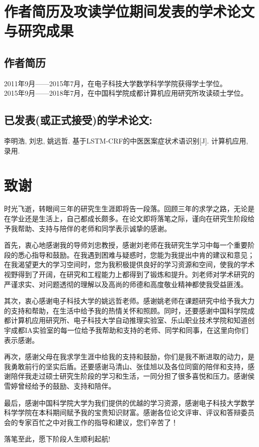 \chapter{作者简历及攻读学位期间发表的学术论文与研究成果}
\section*{作者简历}
\noindent2011年9月——2015年7月，在电子科技大学数学科学学院获得学士学位。\\
\noindent2015年9月——2018年7月，在中国科学院成都计算机应用研究所攻读硕士学位。

\section*{已发表(或正式接受)的学术论文:}
\noindent[1] 李明浩, 刘忠, 姚远哲. 基于LSTM-CRF的中医医案症状术语识别[J]. 计算机应用, 录用.

\chapter{致\quad 谢}
时光飞逝，转眼间三年的研究生生涯即将告一段落。回顾三年的求学之路，无论是在学业还是生活上，自己都成长颇多。在论文即将落笔之际，谨向在研究生阶段给予我帮助、支持与陪伴的老师和同学表示诚挚的感谢。

首先，衷心地感谢我的导师刘忠教授，感谢刘老师在我研究生学习中每一个重要阶段的悉心指导和鼓励。在我遇到困难与疑惑时，您能为我提出中肯的建议和意见；在我渴望更大的学习空间时，您为我积极提供良好的学习资源和空间，使我的学术视野得到了开阔，在研究和工程能力上都得到了锻炼和提升。刘老师对学术研究的严谨求实、对问题透彻的理解以及高尚的师德和高度敬业精神都使我受益匪浅。

其次，衷心感谢电子科技大学的姚远哲老师。感谢姚老师在课题研究中给予我大力的支持和帮助，在生活中给予我的热情关怀和照顾。同时，还要感谢中国科学院成都计算机应用研究所、电子科技大学自动推理实验室、乐山职业技术学院和知道创宇成都IA实验室的每一位给予我帮助和支持的老师、同学和同事，在这里向你们表示感谢。

再次，感谢父母在我求学生涯中给我的支持和鼓励，你们是我不断进取的动力，是我勇敢前行的坚实后盾。还要感谢马清山、张佳旭以及各位同窗的陪伴和支持，感谢陪伴我走过硕士研究生阶段的学习和生活，一同分担了很多喜悦和压力。感谢侯雪婷曾经给予的鼓励、支持和陪伴。

最后，感谢中国科学院大学为我们提供的优越的学习资源，感谢电子科技大学数学科学学院在本科期间赋予我的宝贵知识财富。感谢各位论文评审、评议和答辩委员会的专家百忙之中对我工作的指导和建议，您们辛苦了！

落笔至此，愿下阶段人生顺利起航!
